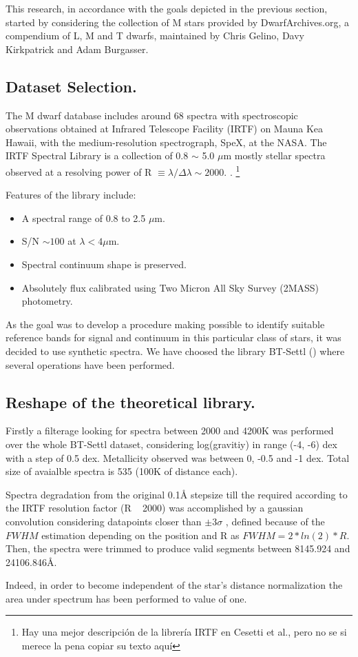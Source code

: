 {
This research, in accordance with the goals depicted in the previous section,
started by considering the collection of M stars provided by
DwarfArchives.org, a compendium of L, M and T dwarfs, 
maintained by Chris Gelino, Davy Kirkpatrick and Adam Burgasser.
}

\subsection{Dataset Selection.}
\label{subsec:DS}
{
The M dwarf database includes around 68 spectra with spectroscopic 
observations obtained at Infrared Telescope Facility (IRTF) on Mauna Kea Hawaii, 
with the medium-resolution spectrograph, SpeX, at the NASA. 
The IRTF Spectral Library is a collection of 0.8 $\sim$ 5.0 $\mu$m mostly stellar 
spectra observed at a resolving power of R $\equiv \lambda / \Delta \lambda \sim 2000$.
\cite{2009ApJS..185..289R}. \footnote{Hay una mejor descripci\'{o}n de la librer\'{i}a IRTF en Cesetti et al., 
pero no se si merece la pena copiar su texto aqu\'{i}}
}

{
Features of the library include:
\begin{itemize}
 \item {A spectral range of 0.8 to 2.5 $\mu$m.}
 \item {S/N $\sim 100 $ at $\lambda < 4 \mu$m.}
 \item {Spectral continuum shape is preserved.}
 \item {Absolutely flux calibrated using Two Micron All Sky Survey (2MASS)  photometry.}
\end{itemize}
}

{
As the goal was to develop a procedure making possible to identify suitable 
reference bands for signal and continuum in this particular class of stars, 
it was decided to use synthetic spectra. We have choosed the library BT-Settl
(\cite{2013MSAIS..24..128A}) where several operations have been performed.
}

\subsection {Reshape of the theoretical library.}
\label{subsec:RTL}
{
Firstly a filterage looking for spectra between 2000 and 4200K was performed over 
the whole BT-Settl dataset, considering log(gravitiy) in range (-4, -6) dex 
with a step of 0.5 dex. Metallicity observed was between 0, -0.5 and -1 dex.
Total size of avaialble spectra is 535 (100K of distance each). 

Spectra degradation from the original 0.1{\AA} stepsize till the required
according to the IRTF resolution factor (R ~ 2000) was accomplished by a gaussian convolution
considering datapoints closer than $\pm 3 \sigma$ , defined because of the $FWHM$ estimation 
depending on the position and R as $ FWHM=2*ln(2)*R $.
Then, the spectra were trimmed to produce valid segments between 8145.924 and 24106.846{\AA}.
}
{
Indeed, in order to become independent of the star\textquoteright s distance 
normalization the area under spectrum has been performed to value of one.
}


